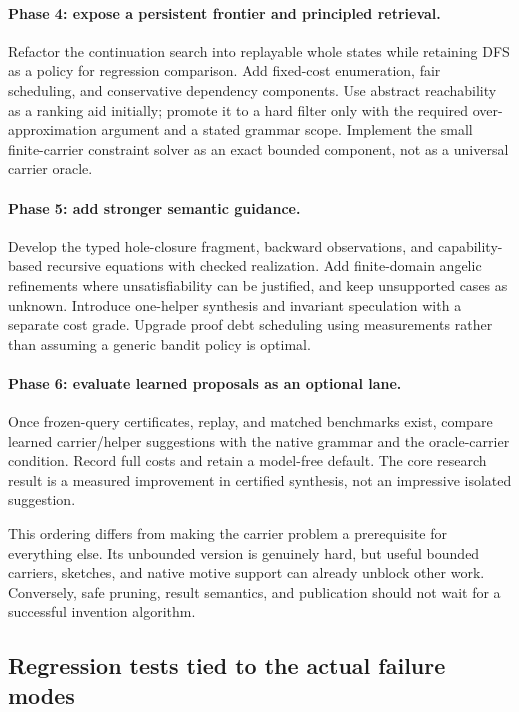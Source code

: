 \paragraph{Phase 4: expose a persistent frontier and principled retrieval.}
Refactor the continuation search into replayable whole states while retaining DFS as a policy for regression comparison. Add fixed-cost enumeration, fair scheduling, and conservative dependency components. Use abstract reachability as a ranking aid initially; promote it to a hard filter only with the required over-approximation argument and a stated grammar scope. Implement the small finite-carrier constraint solver as an exact bounded component, not as a universal carrier oracle.

\paragraph{Phase 5: add stronger semantic guidance.}
Develop the typed hole-closure fragment, backward observations, and capability-based recursive equations with checked realization. Add finite-domain angelic refinements where unsatisfiability can be justified, and keep unsupported cases as unknown. Introduce one-helper synthesis and invariant speculation with a separate cost grade. Upgrade proof debt scheduling using measurements rather than assuming a generic bandit policy is optimal.

\paragraph{Phase 6: evaluate learned proposals as an optional lane.}
Once frozen-query certificates, replay, and matched benchmarks exist, compare learned carrier/helper suggestions with the native grammar and the oracle-carrier condition. Record full costs and retain a model-free default. The core research result is a measured improvement in certified synthesis, not an impressive isolated suggestion.

This ordering differs from making the carrier problem a prerequisite for everything else. Its unbounded version is genuinely hard, but useful bounded carriers, sketches, and native motive support can already unblock other work. Conversely, safe pruning, result semantics, and publication should not wait for a successful invention algorithm.

\subsection{Regression tests tied to the actual failure modes}

